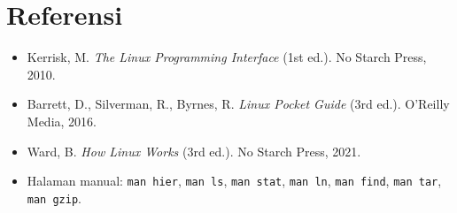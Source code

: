 \section{Referensi}
\label{sec:ref-filesystem}

\begin{itemize}
    \item Kerrisk, M. \textit{The Linux Programming Interface} (1st ed.). No Starch Press, 2010.
    \item Barrett, D., Silverman, R., Byrnes, R. \textit{Linux Pocket Guide} (3rd ed.). O'Reilly Media, 2016.
    \item Ward, B. \textit{How Linux Works} (3rd ed.). No Starch Press, 2021.
    \item Halaman manual: \texttt{man hier}, \texttt{man ls}, \texttt{man stat}, \texttt{man ln}, \texttt{man find}, \texttt{man tar}, \texttt{man gzip}.
\end{itemize}
